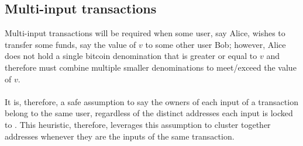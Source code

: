 \subsection{Multi-input transactions}\label{background:multi-input-tx}
Multi-input transactions will be required when some user, say Alice, wishes to transfer some funds, say the value of $v$ to some other user Bob; however, Alice does not hold a single bitcoin denomination that is greater or equal to $v$ and therefore must combine multiple smaller denominations to meet/exceed the value of $v$. 
\\\\
It is, therefore, a safe assumption to say the owners of each input of a transaction belong to the same user, regardless of the distinct addresses each input is locked to \cite{RefWorks:doc:5c3de14be4b042abd3bcc2c6}. This heuristic, therefore, leverages this assumption to cluster together addresses whenever they are the inputs of the same transaction.

